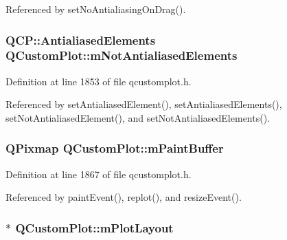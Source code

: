 Referenced by set\+No\+Antialiasing\+On\+Drag().

\hypertarget{class_q_custom_plot_a2b6ebcad00a90ba07f146cefcd4293da}{}
\subsubsection[{m\+Not\+Antialiased\+Elements}]{\setlength{\rightskip}{0pt plus 5cm}Q\+C\+P\+::\+Antialiased\+Elements Q\+Custom\+Plot\+::m\+Not\+Antialiased\+Elements\hspace{0.3cm}{\ttfamily [protected]}}\label{class_q_custom_plot_a2b6ebcad00a90ba07f146cefcd4293da}


Definition at line 1853 of file qcustomplot.\+h.



Referenced by set\+Antialiased\+Element(), set\+Antialiased\+Elements(), set\+Not\+Antialiased\+Element(), and set\+Not\+Antialiased\+Elements().

\hypertarget{class_q_custom_plot_a753630df96e0672098d9e88bd41d1913}{}
\subsubsection[{m\+Paint\+Buffer}]{\setlength{\rightskip}{0pt plus 5cm}Q\+Pixmap Q\+Custom\+Plot\+::m\+Paint\+Buffer\hspace{0.3cm}{\ttfamily [protected]}}\label{class_q_custom_plot_a753630df96e0672098d9e88bd41d1913}


Definition at line 1867 of file qcustomplot.\+h.



Referenced by paint\+Event(), replot(), and resize\+Event().

\hypertarget{class_q_custom_plot_ac97298756882a0eecd98151679850ac1}{}
\subsubsection[{m\+Plot\+Layout}]{$\ast$ Q\+Custom\+Plot\+::m\+Plot\+Layout\hspace{0.3cm}{\ttfamily [protected]}}\label{class_q_custom_plot_ac97298756882a0eecd98151679850ac1}


